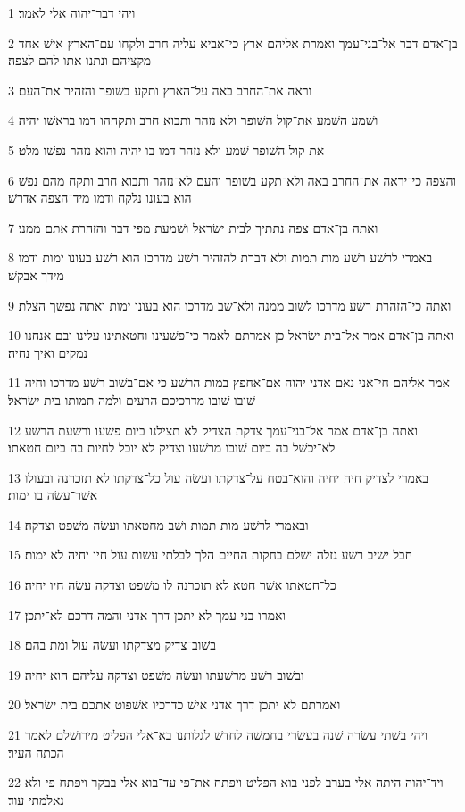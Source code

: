 \par 1 ויהי דבר־יהוה אלי לאמר׃
\par 2 בן־אדם דבר אל־בני־עמך ואמרת אליהם ארץ כי־אביא עליה חרב ולקחו עם־הארץ אישׁ אחד מקציהם ונתנו אתו להם לצפה׃
\par 3 וראה את־החרב באה על־הארץ ותקע בשׁופר והזהיר את־העם׃
\par 4 ושׁמע השׁמע את־קול השׁופר ולא נזהר ותבוא חרב ותקחהו דמו בראשׁו יהיה׃
\par 5 את קול השׁופר שׁמע ולא נזהר דמו בו יהיה והוא נזהר נפשׁו מלט׃
\par 6 והצפה כי־יראה את־החרב באה ולא־תקע בשׁופר והעם לא־נזהר ותבוא חרב ותקח מהם נפשׁ הוא בעונו נלקח ודמו מיד־הצפה אדרשׁ׃
\par 7 ואתה בן־אדם צפה נתתיך לבית ישׂראל ושׁמעת מפי דבר והזהרת אתם ממני׃
\par 8 באמרי לרשׁע רשׁע מות תמות ולא דברת להזהיר רשׁע מדרכו הוא רשׁע בעונו ימות ודמו מידך אבקשׁ׃
\par 9 ואתה כי־הזהרת רשׁע מדרכו לשׁוב ממנה ולא־שׁב מדרכו הוא בעונו ימות ואתה נפשׁך הצלת׃
\par 10 ואתה בן־אדם אמר אל־בית ישׂראל כן אמרתם לאמר כי־פשׁעינו וחטאתינו עלינו ובם אנחנו נמקים ואיך נחיה׃
\par 11 אמר אליהם חי־אני נאם אדני יהוה אם־אחפץ במות הרשׁע כי אם־בשׁוב רשׁע מדרכו וחיה שׁובו שׁובו מדרכיכם הרעים ולמה תמותו בית ישׂראל׃
\par 12 ואתה בן־אדם אמר אל־בני־עמך צדקת הצדיק לא תצילנו ביום פשׁעו ורשׁעת הרשׁע לא־יכשׁל בה ביום שׁובו מרשׁעו וצדיק לא יוכל לחיות בה ביום חטאתו׃
\par 13 באמרי לצדיק חיה יחיה והוא־בטח על־צדקתו ועשׂה עול כל־צדקתו לא תזכרנה ובעולו אשׁר־עשׂה בו ימות׃
\par 14 ובאמרי לרשׁע מות תמות ושׁב מחטאתו ועשׂה משׁפט וצדקה׃
\par 15 חבל ישׁיב רשׁע גזלה ישׁלם בחקות החיים הלך לבלתי עשׂות עול חיו יחיה לא ימות׃
\par 16 כל־חטאתו אשׁר חטא לא תזכרנה לו משׁפט וצדקה עשׂה חיו יחיה׃
\par 17 ואמרו בני עמך לא יתכן דרך אדני והמה דרכם לא־יתכן׃
\par 18 בשׁוב־צדיק מצדקתו ועשׂה עול ומת בהם׃
\par 19 ובשׁוב רשׁע מרשׁעתו ועשׂה משׁפט וצדקה עליהם הוא יחיה׃
\par 20 ואמרתם לא יתכן דרך אדני אישׁ כדרכיו אשׁפוט אתכם בית ישׂראל׃
\par 21 ויהי בשׁתי עשׂרה שׁנה בעשׂרי בחמשׁה לחדשׁ לגלותנו בא־אלי הפליט מירושׁלם לאמר הכתה העיר׃
\par 22 ויד־יהוה היתה אלי בערב לפני בוא הפליט ויפתח את־פי עד־בוא אלי בבקר ויפתח פי ולא נאלמתי עוד׃
